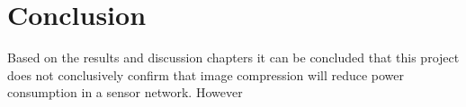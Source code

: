 \chapter{Conclusion}

Based on the results and discussion chapters it can be concluded that this project does not conclusively confirm that image compression will reduce power consumption in a sensor network. However  